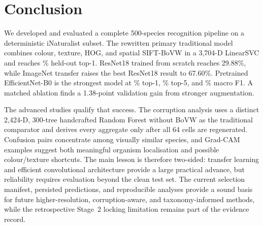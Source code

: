 \section{Conclusion}
\label{sec:conclusion}

We developed and evaluated a complete 500-species recognition pipeline on a
deterministic iNaturalist subset.  The rewritten primary traditional model
combines colour, texture, HOG, and spatial SIFT-BoVW in a 3,704-D LinearSVC and
reaches \PrimaryTraditionalTestTopOnePercent\% held-out top-1.  ResNet18
trained from scratch reaches 29.88\%, while ImageNet transfer raises the best
ResNet18 result to 67.60\%.  Pretrained EfficientNet-B0 is the strongest model
at \BestTestTopOnePercent\% top-1, \BestTestTopFivePercent\% top-5, and
\BestTestMacroFOnePercent\% macro F1.  A matched ablation finds a 1.38-point
validation gain from stronger augmentation.

The advanced studies qualify that success.  The corruption analysis uses a
distinct 2,424-D, 300-tree handcrafted Random Forest without BoVW as the
traditional comparator and derives every aggregate only after all 64 cells are
regenerated.  Confusion pairs concentrate among visually similar species, and
Grad-CAM examples suggest both meaningful organism localisation and possible
colour/texture shortcuts.  The main lesson is therefore two-sided: transfer
learning and efficient convolutional architecture provide a large practical
advance, but reliability requires evaluation beyond the clean test set.  The
current selection manifest, persisted predictions, and reproducible analyses
provide a sound basis for future higher-resolution, corruption-aware, and
taxonomy-informed methods, while the retrospective Stage~2 locking limitation
remains part of the evidence record.
